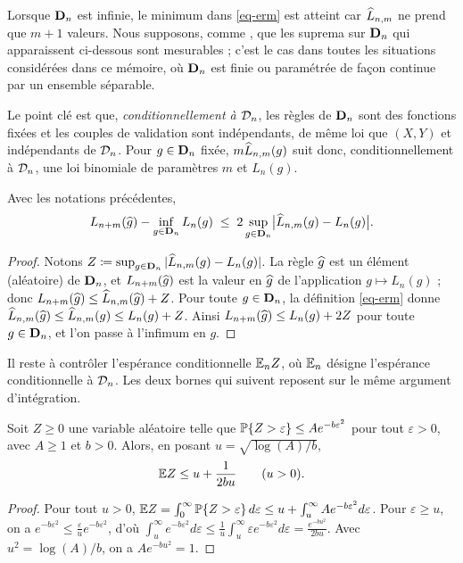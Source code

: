 \begin{remarque}\label{rem-mesurabilite}
Lorsque $\mathbf{D}_n$ est infinie, le minimum dans \eqref{eq-erm} est atteint car $\widehat{L}_{n,m}$ ne prend que $m+1$ valeurs. Nous supposons, comme \citet{devroye1996probabilistic}, que les suprema sur $\mathbf{D}_n$ qui apparaissent ci-dessous sont mesurables ; c'est le cas dans toutes les situations considérées dans ce mémoire, où $\mathbf{D}_n$ est finie ou paramétrée de façon continue par un ensemble séparable.
\end{remarque}

Le point clé est que, \emph{conditionnellement à $\mathcal{D}_n$}, les règles de $\mathbf{D}_n$ sont des fonctions fixées et les couples de validation sont indépendants, de même loi que $(X,Y)$ et indépendants de $\mathcal{D}_n$. Pour $g\in\mathbf{D}_n$ fixée, $m\widehat{L}_{n,m}(g)$ suit donc, conditionnellement à $\mathcal{D}_n$, une loi binomiale de paramètres $m$ et $L_n(g)$.

\begin{lemme}\label{lem-selection}
Avec les notations précédentes,
\[
  L_{n+m}(\widehat{g}) - \inf_{g\in\mathbf{D}_n}L_n(g) \;\le\; 2\sup_{g\in\mathbf{D}_n}\bigl|\widehat{L}_{n,m}(g)-L_n(g)\bigr|.
\]
\end{lemme}

\begin{proof}
Notons $Z\coloneqq\sup_{g\in\mathbf{D}_n}|\widehat{L}_{n,m}(g)-L_n(g)|$. La règle $\widehat{g}$ est un élément (aléatoire) de $\mathbf{D}_n$, et $L_{n+m}(\widehat{g})$ est la valeur en $\widehat{g}$ de l'application $g\mapsto L_n(g)$ ; donc $L_{n+m}(\widehat{g})\le \widehat{L}_{n,m}(\widehat{g})+Z$. Pour toute $g\in\mathbf{D}_n$, la définition \eqref{eq-erm} donne $\widehat{L}_{n,m}(\widehat{g})\le \widehat{L}_{n,m}(g)\le L_n(g)+Z$. Ainsi $L_{n+m}(\widehat{g})\le L_n(g)+2Z$ pour toute $g\in\mathbf{D}_n$, et l'on passe à l'infimum en $g$.
\end{proof}

Il reste à contrôler l'espérance conditionnelle $\mathbb{E}_n Z$, où $\mathbb{E}_n$ désigne l'espérance conditionnelle à $\mathcal{D}_n$. Les deux bornes qui suivent reposent sur le même argument d'intégration.

\begin{lemme}\label{lem-integration}
Soit $Z\ge0$ une variable aléatoire telle que $\mathbb{P}\{Z>\varepsilon\}\le A e^{-b\varepsilon^2}$ pour tout $\varepsilon>0$, avec $A\ge1$ et $b>0$. Alors, en posant $u=\sqrt{\log(A)/b}$,
\[
  \mathbb{E} Z \le u + \frac{1}{2bu} \qquad (u>0).
\]
\end{lemme}

\begin{proof}
Pour tout $u>0$, $\mathbb{E} Z=\int_0^\infty\mathbb{P}\{Z>\varepsilon\}\,d\varepsilon\le u+\int_u^\infty Ae^{-b\varepsilon^2}d\varepsilon$. Pour $\varepsilon\ge u$, on a $e^{-b\varepsilon^2}\le\frac{\varepsilon}{u}e^{-b\varepsilon^2}$, d'où
$\int_u^\infty e^{-b\varepsilon^2}d\varepsilon\le\frac{1}{u}\int_u^\infty\varepsilon e^{-b\varepsilon^2}d\varepsilon=\frac{e^{-bu^2}}{2bu}$. Avec $u^2=\log(A)/b$, on a $Ae^{-bu^2}=1$.
\end{proof}

